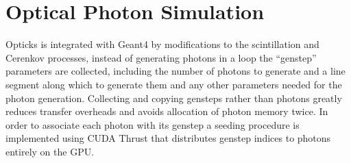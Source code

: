 \documentclass[a4paper]{jpconf}
\begin{document}
%
%
% 
% 
% 


\section{Optical Photon Simulation}

Opticks is integrated with Geant4 by modifications to the 
scintillation and Cerenkov processes, instead of 
generating photons in a loop the ``genstep'' parameters are collected, 
including the number of photons to generate and a line segment 
along which to generate them and any other parameters needed for the 
photon generation.
%
Collecting and copying gensteps rather than photons greatly reduces 
transfer overheads and avoids allocation of photon memory twice.
In order to associate each photon with its genstep a seeding 
procedure is implemented using CUDA Thrust\cite{thrust}
that distributes genstep indices to photons entirely on the GPU.
\end{document}
